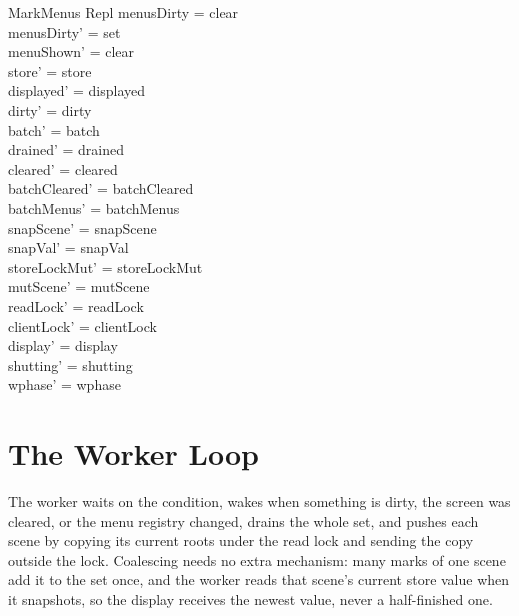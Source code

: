 \documentclass[a4paper,10pt,fleqn]{article}
\begin{document}
\begin{schema}{MarkMenus}
  \Delta Repl
\where
  menusDirty = clear \\
  menusDirty' = set \\
  menuShown' = clear \\
  store' = store \\
  displayed' = displayed \\
  dirty' = dirty \\
  batch' = batch \\
  drained' = drained \\
  cleared' = cleared \\
  batchCleared' = batchCleared \\
  batchMenus' = batchMenus \\
  snapScene' = snapScene \\
  snapVal' = snapVal \\
  storeLockMut' = storeLockMut \\
  mutScene' = mutScene \\
  readLock' = readLock \\
  clientLock' = clientLock \\
  display' = display \\
  shutting' = shutting \\
  wphase' = wphase
\end{schema}

\section{The Worker Loop}

The worker waits on the condition, wakes when something is dirty, the
screen was cleared, or the menu registry changed, drains the whole set, and
pushes each scene by copying its current roots under the read lock and
sending the copy outside the lock.  Coalescing needs no extra mechanism:
many marks of one scene add it to the set once, and the worker reads that
scene's current store value when it snapshots, so the display receives the
newest value, never a half-finished one.
\end{document}
